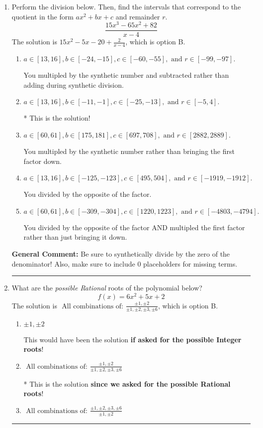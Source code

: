 \documentclass{extbook}[14pt]
\newcommand{\litem}[1]{\item #1

\rule{\textwidth}{0.4pt}}
\begin{document}
\begin{enumerate}\litem{
Perform the division below. Then, find the intervals that correspond to the quotient in the form $ax^2+bx+c$ and remainder $r$.
\[ \frac{15x^{3} -65 x^{2} + 82}{x -4} \]The solution is \( 15x^{2} -5 x -20 + \frac{2}{x -4} \), which is option B.\begin{enumerate}[label=\Alph*.]
\item \( a \in [13, 16], b \in [-24, -15], c \in [-60, -55], \text{ and } r \in [-99, -97]. \)

 You multipled by the synthetic number and subtracted rather than adding during synthetic division.
\item \( a \in [13, 16], b \in [-11, -1], c \in [-25, -13], \text{ and } r \in [-5, 4]. \)

* This is the solution!
\item \( a \in [60, 61], b \in [175, 181], c \in [697, 708], \text{ and } r \in [2882, 2889]. \)

 You multipled by the synthetic number rather than bringing the first factor down.
\item \( a \in [13, 16], b \in [-125, -123], c \in [495, 504], \text{ and } r \in [-1919, -1912]. \)

 You divided by the opposite of the factor.
\item \( a \in [60, 61], b \in [-309, -304], c \in [1220, 1223], \text{ and } r \in [-4803, -4794]. \)

 You divided by the opposite of the factor AND multipled the first factor rather than just bringing it down.
\end{enumerate}

\textbf{General Comment:} Be sure to synthetically divide by the zero of the denominator! Also, make sure to include 0 placeholders for missing terms.
}
\litem{
What are the \textit{possible Rational} roots of the polynomial below?
\[ f(x) = 6x^{2} +5 x + 2 \]The solution is \( \text{ All combinations of: }\frac{\pm 1,\pm 2}{\pm 1,\pm 2,\pm 3,\pm 6} \), which is option B.\begin{enumerate}[label=\Alph*.]
\item \( \pm 1,\pm 2 \)

This would have been the solution \textbf{if asked for the possible Integer roots}!
\item \( \text{ All combinations of: }\frac{\pm 1,\pm 2}{\pm 1,\pm 2,\pm 3,\pm 6} \)

* This is the solution \textbf{since we asked for the possible Rational roots}!
\item \( \text{ All combinations of: }\frac{\pm 1,\pm 2,\pm 3,\pm 6}{\pm 1,\pm 2} \)


\end{enumerate}}
\end{enumerate}
\end{document}
